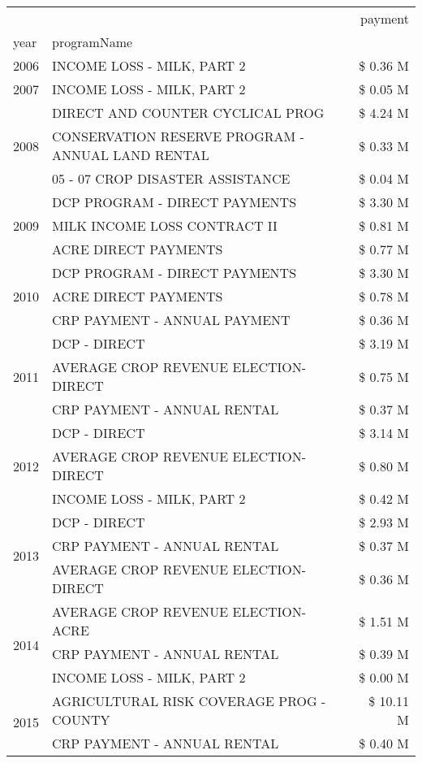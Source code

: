 \begin{tabular}{llr}
\toprule
 &  & payment \\
year & programName &  \\
\midrule
2006 & INCOME LOSS - MILK, PART 2 & \$ 0.36 M \\
\cline{1-3}
2007 & INCOME LOSS - MILK, PART 2 & \$ 0.05 M \\
\cline{1-3}
\multirow[t]{3}{*}{2008} & DIRECT AND COUNTER CYCLICAL PROG & \$ 4.24 M \\
 & CONSERVATION RESERVE PROGRAM - ANNUAL LAND RENTAL & \$ 0.33 M \\
 & 05 - 07 CROP DISASTER ASSISTANCE & \$ 0.04 M \\
\cline{1-3}
\multirow[t]{3}{*}{2009} & DCP PROGRAM - DIRECT PAYMENTS & \$ 3.30 M \\
 & MILK INCOME LOSS CONTRACT II & \$ 0.81 M \\
 & ACRE DIRECT PAYMENTS & \$ 0.77 M \\
\cline{1-3}
\multirow[t]{3}{*}{2010} & DCP PROGRAM - DIRECT PAYMENTS & \$ 3.30 M \\
 & ACRE DIRECT PAYMENTS & \$ 0.78 M \\
 & CRP PAYMENT - ANNUAL PAYMENT & \$ 0.36 M \\
\cline{1-3}
\multirow[t]{3}{*}{2011} & DCP - DIRECT & \$ 3.19 M \\
 & AVERAGE CROP REVENUE ELECTION-DIRECT & \$ 0.75 M \\
 & CRP PAYMENT - ANNUAL RENTAL & \$ 0.37 M \\
\cline{1-3}
\multirow[t]{3}{*}{2012} & DCP - DIRECT & \$ 3.14 M \\
 & AVERAGE CROP REVENUE ELECTION-DIRECT & \$ 0.80 M \\
 & INCOME LOSS - MILK, PART 2 & \$ 0.42 M \\
\cline{1-3}
\multirow[t]{3}{*}{2013} & DCP - DIRECT & \$ 2.93 M \\
 & CRP PAYMENT - ANNUAL RENTAL & \$ 0.37 M \\
 & AVERAGE CROP REVENUE ELECTION-DIRECT & \$ 0.36 M \\
\cline{1-3}
\multirow[t]{3}{*}{2014} & AVERAGE CROP REVENUE ELECTION-ACRE & \$ 1.51 M \\
 & CRP PAYMENT - ANNUAL RENTAL & \$ 0.39 M \\
 & INCOME LOSS - MILK, PART 2 & \$ 0.00 M \\
\cline{1-3}
\multirow[t]{3}{*}{2015} & AGRICULTURAL RISK COVERAGE PROG - COUNTY & \$ 10.11 M \\
 & CRP PAYMENT - ANNUAL RENTAL & \$ 0.40 M \\

\end{tabular}
